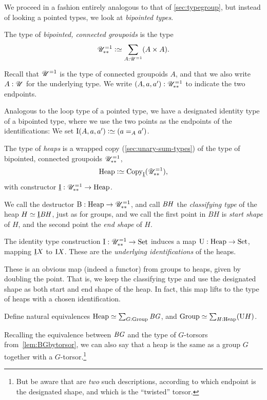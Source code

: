 We proceed in a fashion entirely analogous to that of \cref{sec:typegroup},
but instead of looking a pointed types, we look at \emph{bipointed types}.

\begin{definition}\label{def:bipt-conn-groupoid}
  The type of \emph{bipointed, connected groupoids} is the type
  \[
    \UUppone \defeq \sum_{A:\UU^{=1}}(A \times A).
  \]
\end{definition}
Recall that ${\mathscr{U}}^{=1}$ is the type of connected groupoids $A$,
and that we also write $A:{\mathscr{U}}$ for the underlying type.
We write $(A,a,a'):{\mathscr{U}}_{{\ast}{\ast}}^{=1}$ to indicate the two endpoints.

Analogous to the loop type of a pointed type,
we have a designated identity type of a bipointed type,
where we use the two points as the endpoints of the identifications:
We set $\ISym(A,a,a') \defeq (a =_A a')$.

\begin{definition}\label{def:heap}
  The type of \emph{heaps} is a wrapped copy (\cf \cref{sec:unary-sum-types})
  of the type of bipointed, connected groupoids ${\mathscr{U}}_{{\ast}{\ast}}^{=1}$,
  \[
    \Heap \defeq \Copy_{\mkheap}(\UUppone),
  \]
  with constructor $\underline{\mathrm{I}} : {\mathscr{U}}_{{\ast}{\ast}}^{=1} \to \mathrm{Heap}$.
\end{definition}
We call the destructor $\mathrm{B} : \mathrm{Heap} \to {\mathscr{U}}_{{\ast}{\ast}}^{=1}$,
and call $\mathit{B}\mathit{H}$ the \emph{classifying type} of the heap $H \jdeq\mkheap\BH$,
just as for groups,
and we call the first point in $BH$ is \emph{start shape} of $H$,
and the second point the \emph{end shape} of $H$.

The identity type construction $\mathrm{I} : {\mathscr{U}}_{{\ast}{\ast}}^{=1} \to \mathrm{Set}$
induces a map $\mathrm{U} : \mathrm{Heap} \to \mathrm{Set}$,
mapping $\underline{\mathrm{I}} X$ to $\mathrm{I} X$.
These are the \emph{underlying identifications} of the heaps.

These is an obvious map (indeed a functor) from groups to heaps,
given by doubling the point.
That is, we keep the classifying type and use the designated shape
as both start and end shape of the heap.
In fact, this map lifts to the type of heaps with a chosen identification.
\begin{exercise}\label{xca:group+torsor-heap}
  Define natural equivalences $\mathrm{Heap} \simeq \sum_{G:\mathrm{Group}}\mathit{B}\mathit{G}$,
  and $\mathrm{Group} \simeq \sum_{H:\mathrm{Heap}}(\mathrm{U} H)$.
\end{exercise}
Recalling the equivalence between $\mathit{B}\mathit{G}$ and the type of $G$-torsors
from~\cref{lem:BGbytorsor},
we can also say that a heap is the same
as a group $G$ together with a $G$-torsor.\footnote{%
  But be aware that are \emph{two} such descriptions,
  according to which endpoint is the designated shape,
  and which is the ``twisted'' torsor.}

